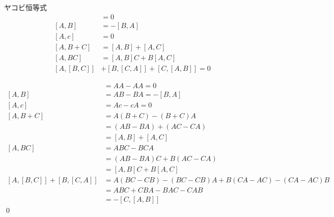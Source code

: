 \documentclass[uplatex,dvipdfmx,a4paper,11pt]{jlreq}
\makeatletter
\numberwithin{equation}{section}
\theoremstyle{definition}
\renewenvironment{proof}[1][\proofname]{\par
  \normalfont
  \topsep6\p@\@plus6\p@ \trivlist
  \item[\hskip\labelsep{\bfseries #1}\@addpunct{\bfseries}]\ignorespaces\quad\par
}{%
  \qed\endtrivlist\@endpefalse
}
\renewcommand\proofname{証明}
\makeatother
\begin{document}
\begin{proposition}
  ヤコビ恒等式
  \begin{align}
    [A, A]      & = 0                             \\
    [A, B]      & = - [B, A]                      \\
    [A, c]      & = 0                             \\
    [A, B + C]  & = [A, B] + [A, C]               \\
    [A, BC]     & = [A, B]C + B[A, C]             \\
    [A, [B, C]] & + [B, [C, A]] + [C, [A, B]] = 0
  \end{align}
\end{proposition}
\begin{proof}
  \begin{align}
    [A, A]                    & = AA - AA = 0                                       \\
    [A, B]                    & = AB - BA = - [B, A]                                \\
    [A, c]                    & = Ac - cA = 0                                       \\
    [A, B + C]                & = A(B + C) - (B + C)A                               \\
                              & = (AB - BA) + (AC - CA)                             \\
                              & = [A, B] + [A, C]                                   \\
    [A, BC]                   & = ABC - BCA                                         \\
                              & = (AB - BA)C + B(AC - CA)                           \\
                              & = [A, B]C + B[A, C]                                 \\
    [A, [B, C]] + [B, [C, A]] & = A(BC - CB) - (BC - CB)A + B(CA - AC) - (CA - AC)B \\
                              & = ABC + CBA - BAC - CAB                             \\
                              & = -[C, [A, B]]
  \end{align}
\end{proof}
\end{document}
